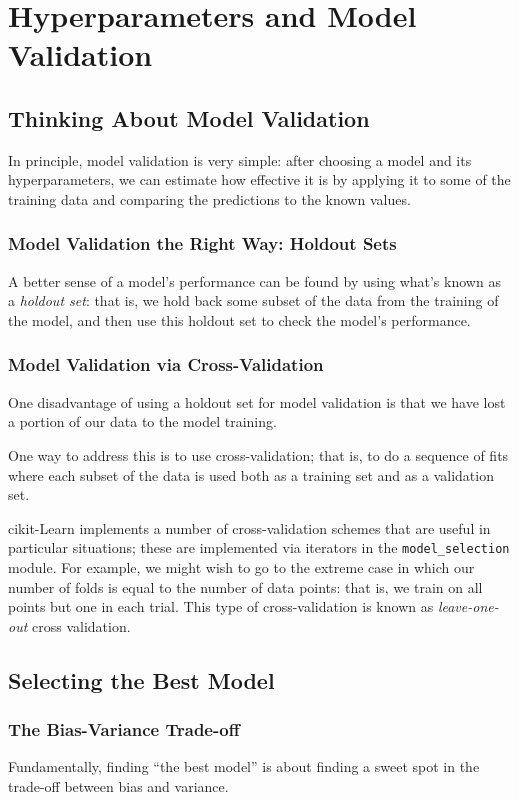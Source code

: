 \chapter{Hyperparameters and Model Validation\label{Ch39}}
\section{Thinking About Model Validation}
In principle, model validation is very simple: after choosing a model and its hyperparameters, we can estimate how effective it is by applying it to some of the training
data and comparing the predictions to the known values.
\subsection*{Model Validation the Right Way: Holdout Sets}
A better sense of a model's performance can be found by using
what's known as a \textit{holdout set}: that is, we hold back some subset of the data from the
training of the model, and then use this holdout set to check the model's performance.
\subsection*{Model Validation via Cross-Validation}
One disadvantage of using a holdout set for model validation is that we have lost a
portion of our data to the model training.

One way to address this is to use cross-validation; that is, to do a sequence of fits
where each subset of the data is used both as a training set and as a validation set.

cikit-Learn implements a number of cross-validation schemes that are useful in particular situations; these are implemented via iterators in the \verb|model_selection| module. For example, we might wish to go to the extreme case in which our number of
folds is equal to the number of data points: that is, we train on all points but one in
each trial. This type of cross-validation is known as \textit{leave-one-out} cross validation.

\section{Selecting the Best Model}
\subsection*{The Bias-Variance Trade-off}
Fundamentally, finding “the best model” is about finding a sweet spot in the trade-off
between bias and variance.

